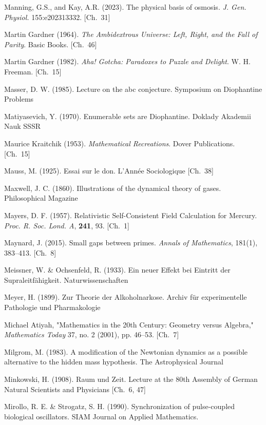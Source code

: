 \begin{list}{}{%
  \setlength{\leftmargin}{2em}%
  \setlength{\itemindent}{-2em}%
  \setlength{\itemsep}{0.35\baselineskip}%
  \setlength{\parsep}{0pt}%
  \setlength{\topsep}{0.5em}}
\item Manning, G.S., and Kay, A.R. (2023). The physical basis of osmosis. \textit{J. Gen. Physiol.} 155:e202313332. \hfill {\scriptsize [Ch.~31]}
\item Martin Gardner (1964). \textit{The Ambidextrous Universe: Left, Right, and the Fall of Parity}. Basic Books. \hfill {\scriptsize [Ch.~46]}
\item Martin Gardner (1982). \textit{Aha! Gotcha: Paradoxes to Puzzle and Delight}. W. H. Freeman. \hfill {\scriptsize [Ch.~15]}
\item Masser, D. W. (1985). Lecture on the abc conjecture. Symposium on Diophantine Problems
\item Matiyasevich, Y. (1970). Enumerable sets are Diophantine. Doklady Akademii Nauk SSSR
\item Maurice Kraitchik (1953). \textit{Mathematical Recreations}. Dover Publications. \hfill {\scriptsize [Ch.~15]}
\item Mauss, M. (1925). Essai sur le don. L'Année Sociologique \hfill {\scriptsize [Ch.~38]}
\item Maxwell, J. C. (1860). Illustrations of the dynamical theory of gases. Philosophical Magazine
\item Mayers, D. F. (1957). Relativistic Self-Consistent Field Calculation for Mercury. \textit{Proc. R. Soc. Lond. A}, \textbf{241}, 93. \hfill {\scriptsize [Ch.~1]}
\item Maynard, J. (2015). Small gaps between primes. \textit{Annals of Mathematics}, 181(1), 383–413. \hfill {\scriptsize [Ch.~8]}
\item Meissner, W. \& Ochsenfeld, R. (1933). Ein neuer Effekt bei Eintritt der Supraleitfähigkeit. Naturwissenschaften
\item Meyer, H. (1899). Zur Theorie der Alkoholnarkose. Archiv für experimentelle Pathologie und Pharmakologie
\item Michael Atiyah, "Mathematics in the 20th Century: Geometry versus Algebra," \textit{Mathematics Today} 37, no. 2 (2001), pp. 46–53. \hfill {\scriptsize [Ch.~7]}
\item Milgrom, M. (1983). A modification of the Newtonian dynamics as a possible alternative to the hidden mass hypothesis. The Astrophysical Journal
\item Minkowski, H. (1908). Raum und Zeit. Lecture at the 80th Assembly of German Natural Scientists and Physicians \hfill {\scriptsize [Ch.~6, 47]}
\item Mirollo, R. E. \& Strogatz, S. H. (1990). Synchronization of pulse-coupled biological oscillators. SIAM Journal on Applied Mathematics.

\end{list}
